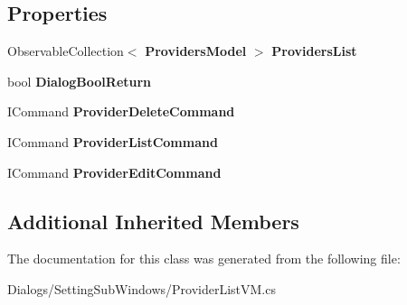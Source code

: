 \subsection*{Properties}
\begin{DoxyCompactItemize}
\item 
\mbox{\label{class_a_f_h___scheduler_1_1_dialogs_1_1_setting_sub_windows_1_1_provider_list_v_m_a1e76d3002868f0cc956d3cd1ca336f1c}} 
Observable\+Collection$<$ \textbf{ Providers\+Model} $>$ {\bfseries Providers\+List}\hspace{0.3cm}{\ttfamily  [get, set]}
\item 
\mbox{\label{class_a_f_h___scheduler_1_1_dialogs_1_1_setting_sub_windows_1_1_provider_list_v_m_ad6a7dea33625803effb3aee61b0d77d0}} 
bool {\bfseries Dialog\+Bool\+Return}\hspace{0.3cm}{\ttfamily  [get, set]}
\item 
\mbox{\label{class_a_f_h___scheduler_1_1_dialogs_1_1_setting_sub_windows_1_1_provider_list_v_m_a7241c32a2e010affdf717aaf54e08dda}} 
I\+Command {\bfseries Provider\+Delete\+Command}\hspace{0.3cm}{\ttfamily  [get]}
\item 
\mbox{\label{class_a_f_h___scheduler_1_1_dialogs_1_1_setting_sub_windows_1_1_provider_list_v_m_ac41f2f7951ec5822cb1ab47752dc2173}} 
I\+Command {\bfseries Provider\+List\+Command}\hspace{0.3cm}{\ttfamily  [get]}
\item 
\mbox{\label{class_a_f_h___scheduler_1_1_dialogs_1_1_setting_sub_windows_1_1_provider_list_v_m_a202b7f7ecf321b4e859510f31fb9a402}} 
I\+Command {\bfseries Provider\+Edit\+Command}\hspace{0.3cm}{\ttfamily  [get]}
\end{DoxyCompactItemize}
\subsection*{Additional Inherited Members}


The documentation for this class was generated from the following file\+:\begin{DoxyCompactItemize}
\item 
Dialogs/\+Setting\+Sub\+Windows/Provider\+List\+V\+M.\+cs\end{DoxyCompactItemize}

